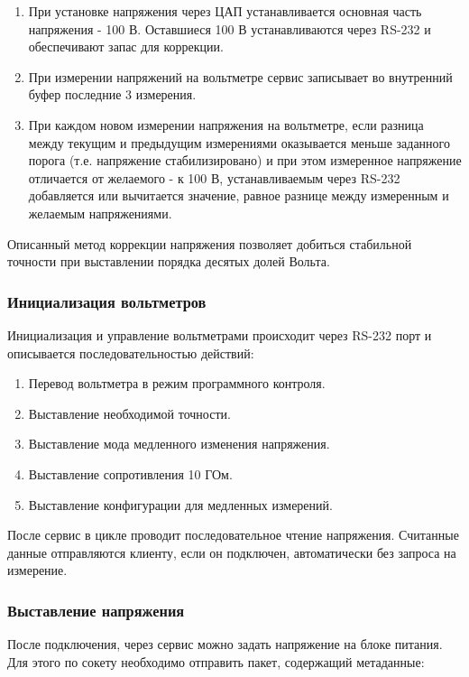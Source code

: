 \documentclass[a4paper,14pt]{extreport}
\begin{document}
\begin{enumerate}
\item При установке напряжения через ЦАП устанавливается основная часть напряжения - 100 В. Оставшиеся 100 В устанавливаются через RS-232 и обеспечивают запас для коррекции. 
\item При измерении напряжений на вольтметре сервис записывает во внутренний буфер последние 3 измерения. 
\item При каждом новом измерении напряжения на вольтметре, если разница между текущим и предыдущим измерениями оказывается меньше заданного порога (т.е. напряжение стабилизировано) и при этом измеренное напряжение отличается от желаемого - к 100 В, устанавливаемым через RS-232 добавляется или вычитается значение, равное разнице между измеренным и желаемым напряжениями.
\end{enumerate}
Описанный метод коррекции напряжения позволяет добиться стабильной точности при выставлении порядка десятых долей Вольта.

\subsubsection{Инициализация вольтметров}

Инициализация и управление вольтметрами происходит через RS-232 порт и описывается последовательностью действий:

\begin{enumerate}
\item Перевод вольтметра в режим программного контроля.
\item Выставление необходимой точности.
\item Выставление мода медленного изменения напряжения.
\item Выставление сопротивления 10 ГОм.
\item Выставление конфигурации для медленных измерений.
\end{enumerate}
После сервис в цикле проводит последовательное чтение напряжения. Считанные данные отправляются клиенту, если он подключен, автоматически без запроса на измерение.

\subsubsection{Выставление напряжения}

После подключения, через сервис можно задать напряжение на блоке питания. Для этого по сокету необходимо отправить пакет, содержащий метаданные:
\end{document}
